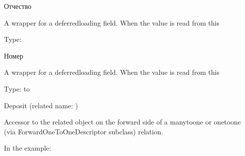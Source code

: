 \documentclass[letterpaper,10pt,russian]{sphinxmanual}
\begin{document}
\begin{fulllineitems}
\begin{fulllineitems}
\sphinxAtStartPar
Отчество

\sphinxAtStartPar
A wrapper for a deferred\sphinxhyphen{}loading field. When the value is read from this

\end{fulllineitems}


\begin{fulllineitems}
\label{\detokenize{myapp:polls.models.Client.phone_number}}
\pysigstartsignatures
\pysigline
{}
\pysigstopsignatures
\sphinxAtStartPar
Type: 

\sphinxAtStartPar
Номер

\sphinxAtStartPar
A wrapper for a deferred\sphinxhyphen{}loading field. When the value is read from this

\end{fulllineitems}


\begin{fulllineitems}
\label{\detokenize{myapp:polls.models.Client.deposit}}
\pysigstartsignatures
\pysigline
{}
\pysigstopsignatures
\sphinxAtStartPar
Type:  to {\hyperref[\detokenize{myapp:polls.models.Deposit}]{}}

\sphinxAtStartPar
Deposit (related name: {\hyperref[\detokenize{myapp:polls.models.Deposit.clients}]{}})

\sphinxAtStartPar
Accessor to the related object on the forward side of a many\sphinxhyphen{}to\sphinxhyphen{}one or
one\sphinxhyphen{}to\sphinxhyphen{}one (via ForwardOneToOneDescriptor subclass) relation.

\sphinxAtStartPar
In the example:

\begin{sphinxVerbatim}[commandchars=\\\{\}]
       
\end{sphinxVerbatim}


\end{fulllineitems}
\end{fulllineitems}
\end{document}
